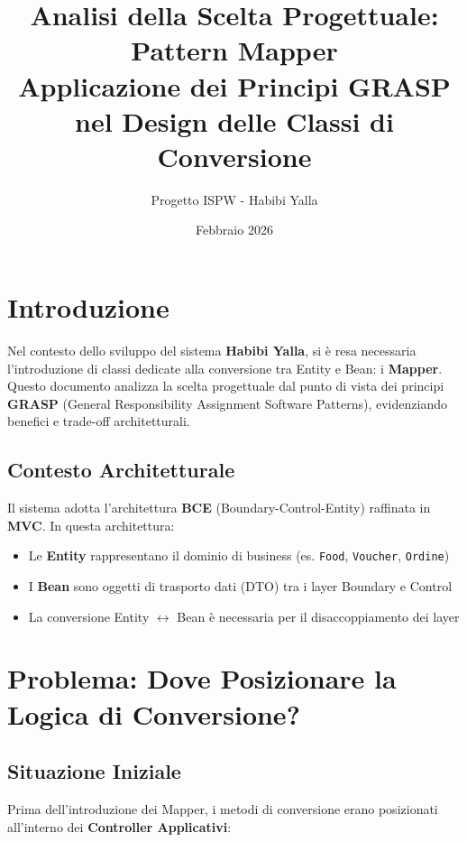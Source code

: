 \documentclass[12pt,a4paper]{article}
\title{\textbf{Analisi della Scelta Progettuale: Pattern Mapper}\\[0.5cm]
\large Applicazione dei Principi GRASP nel Design delle Classi di Conversione}
\author{Progetto ISPW - Habibi Yalla}
\date{Febbraio 2026}
\begin{document}
\maketitle

\tableofcontents
\newpage

\section{Introduzione}

Nel contesto dello sviluppo del sistema \textbf{Habibi Yalla}, si è resa necessaria l'introduzione di classi dedicate alla conversione tra Entity e Bean: i \textbf{Mapper}. Questo documento analizza la scelta progettuale dal punto di vista dei principi \textbf{GRASP} (General Responsibility Assignment Software Patterns), evidenziando benefici e trade-off architetturali.

\subsection{Contesto Architetturale}

Il sistema adotta l'architettura \textbf{BCE} (Boundary-Control-Entity) raffinata in \textbf{MVC}. In questa architettura:
\begin{itemize}
    \item Le \textbf{Entity} rappresentano il dominio di business (es. \texttt{Food}, \texttt{Voucher}, \texttt{Ordine})
    \item I \textbf{Bean} sono oggetti di trasporto dati (DTO) tra i layer Boundary e Control
    \item La conversione Entity $\leftrightarrow$ Bean è necessaria per il disaccoppiamento dei layer
\end{itemize}

\section{Problema: Dove Posizionare la Logica di Conversione?}

\subsection{Situazione Iniziale}

Prima dell'introduzione dei Mapper, i metodi di conversione erano posizionati all'interno dei \textbf{Controller Applicativi}:
\end{document}
